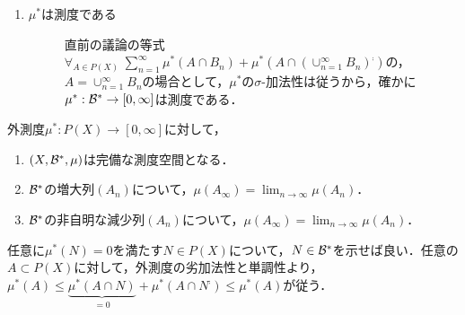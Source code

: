 \documentclass[uplatex, dvipdfmx]{jsreport}
\begin{document}
\begin{Proof}
\begin{enumerate}
        \item \begin{description}
            \item[$\mu^*$は測度である] 直前の議論の等式$\forall_{A\in P(X)}\;\sum^\infty_{n=1}\mu^*(A\cap B_n)+\mu^*(A\cap(\cup^\infty_{n=1}B_n)^\comp)$の，$A=\cup^\infty_{n=1}B_n$の場合として，$\mu^*$の$\sigma$-加法性は従うから，確かに$\mu^*:\mathcal{B}^*\to[0,\infty]$は測度である．
        \end{description}
    \end{enumerate}
\end{Proof}

\begin{theorem}[完備性]
    外測度$\mu^*:P(X)\to[0,\infty]$に対して，
    \begin{enumerate}
        \item $(X,\mathcal{B}^*,\mu)$は完備な測度空間となる．
        \item $\mathcal{B}^*$の増大列$(A_n)$について，$\mu(A_\infty)=\lim_{n\to\infty}\mu(A_n)$．
        \item $\mathcal{B}^*$の非自明な減少列$(A_n)$について，$\mu(A_\infty)=\lim_{n\to\infty}\mu(A_n)$．
    \end{enumerate}
\end{theorem}
\begin{Proof}
    任意に$\mu^*(N)=0$を満たす$N\in P(X)$について，$N\in\mathcal{B}^*$を示せば良い．任意の$A\subset P(X)$に対して，外測度の劣加法性と単調性より，$\mu^*(A)\le\underbrace{\mu^*(A\cap N)}_{=0}+\mu^*(A\cap N^\comp)\le\mu^*(A)$が従う．
\end{Proof}
\end{document}
